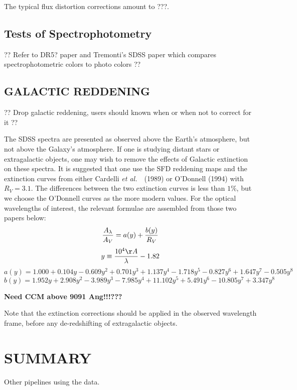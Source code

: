 \documentclass[12pt,preprint]{aastex}
\newcommand{\etal}{{\it et al.}~}
\begin{document}
The typical flux distortion corrections amount to ???.

\subsection{Tests of Spectrophotometry}

?? Refer to DR5? paper and Tremonti's SDSS paper which compares 
spectrophotometric colors to photo colors ??


\subsection{GALACTIC REDDENING}

?? Drop galactic reddening, users should known when or when not to correct for it ??

The SDSS spectra are presented as observed above the Earth's
atmosphere, but not above the Galaxy's atmosphere.
If one is studying distant stars or extragalactic objects,
one may wish to remove the effects of Galactic extinction
on these spectra.  It is suggested that one use the SFD reddening
maps and the extinction curves from either Cardelli \etal\ (1989)
or O'Donnell (1994) with $R_V=3.1$.  The differences between the
two extinction curves is less than $1\%$, but we choose the O'Donnell
curves as the more modern values.  For the optical wavelengths
of interest, the relevant formulae are
assembled from those two papers below:
$$ {A_\lambda \over A_V} = a(y) + {b(y)\over R_V} $$
$$ y \equiv {10^4\AA \over \lambda} - 1.82 $$
$$ a(y) = 1.000 + 0.104 y - 0.609 y^2 + 0.701 y^3 + 1.137 y^4
  - 1.718 y^5 - 0.827 y^6 + 1.647 y^7 - 0.505 y^8 $$
$$ b(y) = 1.952 y + 2.908 y^2 - 3.989 y^3 - 7.985 y^4
  + 11.102 y^5 + 5.491 y^6 - 10.805 y^7 + 3.347 y^8 $$

{\bf Need CCM above 9091 Ang!!!???}

Note that the extinction corrections should be applied in the
observed wavelength frame, before any de-redshifting of extragalactic objects.


\section{SUMMARY}

Other pipelines using the data.
\end{document}
